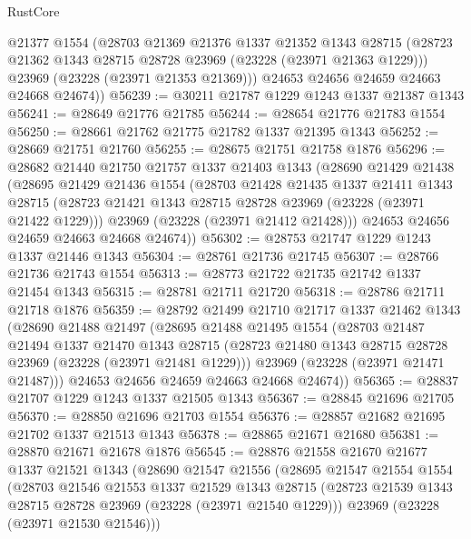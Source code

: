 \begin{lexlean}{RustCore}
\begin{coremodule}
        @21377
        @1554
        (@28703
          @21369
          @21376
          @1337
          @21352
          @1343
          @28715
          (@28723 @21362 @1343 @28715 @28728 @23969 (@23228 (@23971 @21363 @1229)))
          @23969
          (@23228 (@23971 @21353 @21369)))
        @24653
        @24656
        @24659
        @24663
        @24668
        @24674))
@56239 := @30211 @21787 @1229 @1243 @1337 @21387 @1343
@56241 := @28649 @21776 @21785
@56244 := @28654 @21776 @21783 @1554
@56250 := @28661 @21762 @21775 @21782 @1337 @21395 @1343
@56252 := @28669 @21751 @21760
@56255 := @28675 @21751 @21758 @1876
@56296 := @28682
    @21440
    @21750
    @21757
    @1337
    @21403
    @1343
    (@28690
      @21429
      @21438
      (@28695
        @21429
        @21436
        @1554
        (@28703
          @21428
          @21435
          @1337
          @21411
          @1343
          @28715
          (@28723 @21421 @1343 @28715 @28728 @23969 (@23228 (@23971 @21422 @1229)))
          @23969
          (@23228 (@23971 @21412 @21428)))
        @24653
        @24656
        @24659
        @24663
        @24668
        @24674))
@56302 := @28753 @21747 @1229 @1243 @1337 @21446 @1343
@56304 := @28761 @21736 @21745
@56307 := @28766 @21736 @21743 @1554
@56313 := @28773 @21722 @21735 @21742 @1337 @21454 @1343
@56315 := @28781 @21711 @21720
@56318 := @28786 @21711 @21718 @1876
@56359 := @28792
    @21499
    @21710
    @21717
    @1337
    @21462
    @1343
    (@28690
      @21488
      @21497
      (@28695
        @21488
        @21495
        @1554
        (@28703
          @21487
          @21494
          @1337
          @21470
          @1343
          @28715
          (@28723 @21480 @1343 @28715 @28728 @23969 (@23228 (@23971 @21481 @1229)))
          @23969
          (@23228 (@23971 @21471 @21487)))
        @24653
        @24656
        @24659
        @24663
        @24668
        @24674))
@56365 := @28837 @21707 @1229 @1243 @1337 @21505 @1343
@56367 := @28845 @21696 @21705
@56370 := @28850 @21696 @21703 @1554
@56376 := @28857 @21682 @21695 @21702 @1337 @21513 @1343
@56378 := @28865 @21671 @21680
@56381 := @28870 @21671 @21678 @1876
@56545 := @28876
    @21558
    @21670
    @21677
    @1337
    @21521
    @1343
    (@28690
      @21547
      @21556
      (@28695
        @21547
        @21554
        @1554
        (@28703
          @21546
          @21553
          @1337
          @21529
          @1343
          @28715
          (@28723 @21539 @1343 @28715 @28728 @23969 (@23228 (@23971 @21540 @1229)))
          @23969
          (@23228 (@23971 @21530 @21546)))

\end{coremodule}
\end{lexlean}

